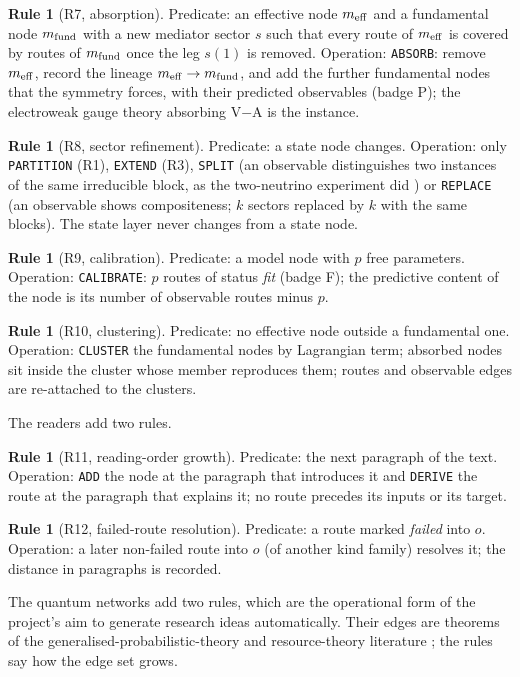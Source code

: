 \documentclass[11pt,a4paper,twoside,openany]{report}
\theoremstyle{plain}
\theoremstyle{definition}
\newtheorem{rule_}[theorem]{Rule}
\theoremstyle{remark}
\newcommand{\op}[1]{\texttt{\MakeUppercase{#1}}}
\begin{document}
\begin{rule_}[R7, absorption]
Predicate: an effective node $m_{\rm eff}$ and a fundamental node $m_{\rm fund}$ with a new mediator sector $s$ such that every route of $m_{\rm eff}$ is covered by routes of $m_{\rm fund}$ once the leg $s(1)$ is removed. Operation: \op{absorb}: remove $m_{\rm eff}$, record the lineage $m_{\rm eff}\to m_{\rm fund}$, and add the further fundamental nodes that the symmetry forces, with their predicted observables (badge P); the electroweak gauge theory \citep{glashow1961,weinberg1967} absorbing V$-$A is the instance.
\end{rule_}
\begin{rule_}[R8, sector refinement]
Predicate: a state node changes. Operation: only \op{partition} (R1), \op{extend} (R3), \op{split} (an observable distinguishes two instances of the same irreducible block, as the two-neutrino experiment did \citep{danby1962}) or \op{replace} (an observable shows compositeness; $k$ sectors replaced by $k$ with the same blocks). The state layer never changes from a state node.
\end{rule_}
\begin{rule_}[R9, calibration]
Predicate: a model node with $p$ free parameters. Operation: \op{calibrate}: $p$ routes of status \emph{fit} (badge F); the predictive content of the node is its number of observable routes minus $p$.
\end{rule_}
\begin{rule_}[R10, clustering]
Predicate: no effective node outside a fundamental one. Operation: \op{cluster} the fundamental nodes by Lagrangian term; absorbed nodes sit inside the cluster whose member reproduces them; routes and observable edges are re-attached to the clusters.
\end{rule_}
The readers add two rules.
\begin{rule_}[R11, reading-order growth]
Predicate: the next paragraph of the text. Operation: \op{add} the node at the paragraph that introduces it and \op{derive} the route at the paragraph that explains it; no route precedes its inputs or its target.
\end{rule_}
\begin{rule_}[R12, failed-route resolution]
Predicate: a route marked \emph{failed} into $o$. Operation: a later non-failed route into $o$ (of another kind family) resolves it; the distance in paragraphs is recorded.
\end{rule_}
The quantum networks add two rules, which are the operational form of the project's aim to generate research ideas automatically. Their edges are theorems of the generalised-probabilistic-theory and resource-theory literature \citep{spekkens2005,plavala2016,barnum2007,schmid2021,aubrun2022,howard2014,marvian2016,chitambar2019,takagi2019,lostaglio2018}; the rules say how the edge set grows.
\end{document}
